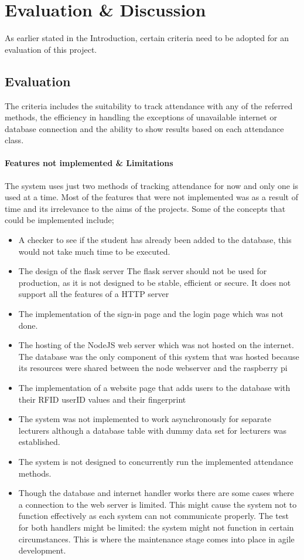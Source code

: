 \chapter{Evaluation \& Discussion}
As earlier stated in the Introduction, certain criteria need to be adopted for an evaluation of this project.
\section{Evaluation}
The criteria includes the suitability to track attendance with any of the referred methods, the efficiency in handling the exceptions of unavailable internet or database connection and the ability to show results based on each attendance class.
\subsubsection{Features not implemented \& Limitations}
The system uses just two methods of tracking attendance for now and only one is used at a time. Most of the features that were not implemented was as a result of time and its irrelevance to the aims of the projects. Some of the concepts that could be implemented include;
\begin{itemize}
\item A checker to see if the student has already been added to the database, this would not take much time to be executed.
\item The design of the flask server  The flask server should not be used for production, as it is not designed to be stable, efficient or secure. It does not support all the features of a HTTP server
\item The implementation of the sign-in page and the login page which was not done.
\item The hosting of the NodeJS web server which was not hosted on the internet. The database was the only component of this system that was hosted because its resources were shared between the node webserver and the raspberry pi
\item The implementation of a website page that adds users to the database with their RFID userID values and their fingerprint
\item The system was not implemented to work asynchronously for separate lecturers although a database table with dummy data set for lecturers was established.
\item The system is not designed to concurrently run the implemented attendance methods.
\item Though the database and internet handler works there are some cases where a connection to the web server is limited. This might cause the system not to function effectively as each system can not communicate properly. The test for both handlers might be limited: the system might not function in certain circumstances. This is where the maintenance stage comes into place in agile development.
\end{itemize} 
